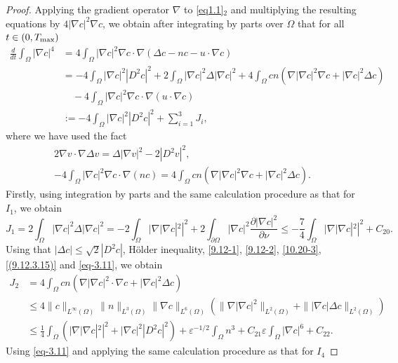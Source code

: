 \documentclass[reqno]{amsart}
\begin{document}
\begin{proof}
Applying the gradient operator $\nabla$ to \eqref{eq1.1}$_2$ and multiplying the 
resulting equations by $4|\nabla c|^2 \nabla c$, we obtain after integrating by parts 
over $\Omega$ that for all $t \in (0, T_{\rm max})$
\begin{equation}\label{eq3.38}
\begin{aligned}
\frac{d}{dt} \int_{\Omega} |\nabla c|^4
&= 4 \int_{\Omega} |\nabla c|^2 \nabla c \cdot \nabla ( \Delta c - n c - u \cdot \nabla c ) \\
&=- 4 \int_{\Omega} |\nabla c|^2 |D^2 c|^2
+ 2 \int_{\Omega} |\nabla c|^2 \Delta |\nabla c|^2 + 4 \int_{\Omega} c n( \nabla |\nabla c|^2 \nabla c + |\nabla c|^2 \Delta c ) \\
& \quad - 4 \int_{\Omega} |\nabla c|^2 \nabla c \cdot \nabla (u \cdot \nabla c) \\
&:= - 4 \int_{\Omega} |\nabla c|^2 |D^2 c|^2 +\sum_{i=1}^{3}J_i,
\end{aligned}
\end{equation}
where we have used the fact 
\begin{gather*}
2\nabla v \cdot \nabla \Delta v = \Delta | \nabla v |^2 - 2 | D^2 v |^2 , \\
-4 \int_{\Omega}
|\nabla c|^2 \nabla c \cdot \nabla(n c) = 4 \int_{\Omega} c n( \nabla |\nabla c|^2 
\nabla c + |\nabla c|^2 \Delta c ).
\end{gather*}
Firstly, using integration by parts and the same calculation procedure as that for $I_1$, 
we obtain
\[
J_1 = 2 \int_{\Omega} |\nabla c|^2 \Delta |\nabla c|^2 
= -2 \int_{\Omega} |\nabla |\nabla c|^2|^2 + 2 \int_{\partial \Omega} |\nabla c|^2
\frac{\partial |\nabla c|^2}{\partial \nu}
 \leq -\frac{7}{4} \int_{\Omega} |\nabla |\nabla c|^2|^2 + C_{20}.
\]
Using that $ |\Delta c| \leq \sqrt{2} |D^2 c|$, H\"{o}lder inequality, 
\eqref{9.12-1}, \eqref{9.12-2}, \eqref{10.20-3}, \eqref{(9.12.3.15)} and 
\eqref{eq-3.11}, we obtain
\begin{align*}
J_2 
&= 4 \int_{\Omega} c n ( \nabla |\nabla c|^2 \cdot \nabla c + |\nabla c|^2 \Delta c )
\\
&\leq 4\|c\|_{L^\infty(\Omega)}\|n\|_{L^3(\Omega)} \|\nabla c\|_{L^6(\Omega)}
( \|\nabla |\nabla c|^2\|_{L^2(\Omega)} + \||\nabla c| \Delta c\|_{L^2(\Omega)} ) \\
&\leq \frac{1}{4} \int_{\Omega} \left(| \nabla |\nabla c|^2|^2
+ |\nabla c|^2 |D^2 c|^2\right) +\varepsilon^{-1/2}\int_{\Omega} n^3
 + C_{21}\varepsilon\int_{\Omega} |\nabla c|^6 + C_{22}.
\end{align*}
Using \eqref{eq-3.11} and applying the same calculation procedure as that for $I_4$ 

\end{proof}
\end{document}
